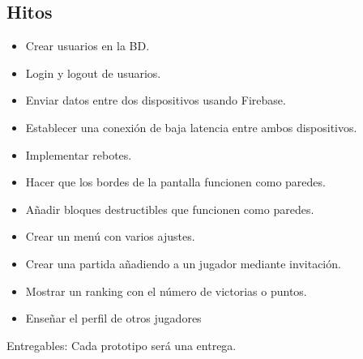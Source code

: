 \documentclass[a4paper,openright,12pt]{article}
\begin{document}
\subsection{Hitos}
\begin{itemize}
\item Crear usuarios en la BD.
\item Login y logout de usuarios.
\item Enviar datos entre dos dispositivos usando Firebase.
\item Establecer una conexión de baja latencia entre ambos dispositivos.
\item Implementar rebotes.
\item Hacer que los bordes de la pantalla funcionen como paredes.
\item Añadir bloques destructibles que funcionen como paredes.
\item Crear un menú con varios ajustes.
\item Crear una partida añadiendo a un jugador mediante invitación.
\item Mostrar un ranking con el número de victorias o puntos.
\item Enseñar el perfil de otros jugadores
\end{itemize}

Entregables:
Cada prototipo será una entrega.

\end{document}

